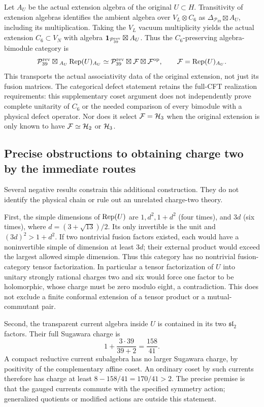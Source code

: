 Let $A_U$ be the actual extension algebra of the original
$U\subset H$. Transitivity of extension algebras identifies the
ambient algebra over $V_L\otimes C_6$ as
$\Delta_{\mathcal P_{39}}\boxtimes A_U$, including its
multiplication. Taking the $V_L$ vacuum multiplicity yields the
actual extension $C_6\subset V_N$ with algebra
$\mathbf1_{\mathcal P_{39}^{\rm rev}}\boxtimes A_U$.
Thus the $C_6$-preserving algebra-bimodule category is
\[
 \mathcal P_{39}^{\rm rev}\boxtimes
 {}_{A_U}\operatorname{Rep}(U)_{A_U}
 \simeq\mathcal P_{39}^{\rm rev}\boxtimes
 \mathcal F\boxtimes\mathcal F^{\rm op},
 \qquad \mathcal F=\operatorname{Rep}(U)_{A_U}.
\]
This transports the actual associativity data of the original
extension, not just its fusion matrices. The categorical defect
statement retains the full-CFT realization requirements: this
supplementary coset argument does not independently prove complete
unitarity of $C_6$ or the needed comparison of every bimodule with
a physical defect operator. Nor does it select $\mathcal F=\mathcal H_3$
when the original extension is only known to have
$\mathcal F\simeq\mathcal H_2$ or $\mathcal H_3$.

\subsection{Precise obstructions to obtaining charge two by the immediate routes}

Several negative results constrain this additional construction.
They do not identify the physical chain or rule out an unrelated
charge-two theory.

First, the simple dimensions of $\operatorname{Rep}(U)$ are
$1,d^2,1+d^2$ (four times), and $3d$ (six times), where
$d=(3+\sqrt{13})/2$. Its only invertible is the unit and
$(3d)^2>1+d^2$. If two nontrivial fusion factors existed, each
would have a noninvertible simple of dimension at least $3d$;
their external product would exceed the largest allowed simple
dimension. Thus this category has no nontrivial fusion-category
tensor factorization. In particular a tensor factorization of
$U$ into unitary strongly rational charges two and six would
force one factor to be holomorphic, whose charge must be zero
modulo eight, a contradiction. This does not exclude a finite
conformal extension of a tensor product or a mutual-commutant pair.

Second, the transparent current algebra inside $U$ is contained
in its two $\mathfrak{sl}_2$ factors. Their full Sugawara charge is
\[
 1+\frac{3\cdot39}{39+2}=\frac{158}{41}.
\]
A compact reductive current subalgebra has no larger Sugawara
charge, by positivity of the complementary affine coset.
An ordinary coset by such currents therefore has charge at least
$8-158/41=170/41>2$. The precise premise is that the gauged
currents commute with the specified symmetry action; generalized
quotients or modified actions are outside this statement.


